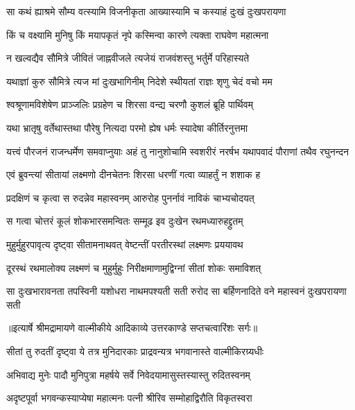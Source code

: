 \twolineshloka
{सा कथं ह्याश्रमे सौम्य वत्स्यामि विजनीकृता}
{आख्यास्यामि च कस्याहं दुःखं दुःखपरायणा} %

\twolineshloka
{किं च वक्ष्यामि मुनिषु किं मयापकृतं नृपे}
{कस्मिन्वा कारणे त्यक्ता राघवेण महात्मना} %

\twolineshloka
{न खल्वद्यैव सौमित्रे जीवितं जाह्नवीजले}
{त्यजेयं राजवंशस्तु भर्तुर्मे परिहास्यते} %

\twolineshloka
{यथाज्ञां कुरु सौमित्रे त्यज मां दुःखभागिनीम्}
{निदेशे स्थीयतां राज्ञः शृणु चेदं वचो मम} %

\twolineshloka
{श्वश्रूणामविशेषेण प्राञ्जलिः प्रग्रहेण च}
{शिरसा वन्द्य चरणौ कुशलं ब्रूहि पार्थिवम्} %

\twolineshloka
{यथा भ्रातृषु वर्तेथास्तथा पौरेषु नित्यदा}
{परमो ह्येष धर्मः स्यादेषा कीर्तिरनुत्तमा} %

\threelineshloka
{यत्त्वं पौरजनं राजन्धर्मेण समवाप्नुयाः}
{अहं तु नानुशोचामि स्वशरीरं नरर्षभ}
{यथापवादं पौराणां तथैव रघुनन्दन} %

\twolineshloka
{एवं ब्रुवन्त्यां सीतायां लक्ष्मणो दीनचेतनः}
{शिरसा धरणीं गत्वा व्याहर्तुं न शशाक ह} %

\twolineshloka
{प्रदक्षिणं च कृत्वा स रुदन्नेव महास्वनम्}
{आरुरोह पुनर्नावं नाविकं चाभ्यचोदयत्} %

\twolineshloka
{स गत्वा चोत्तरं कूलं शोकभारसमन्वितः}
{सम्मूढ इव दुःखेन रथमध्यारुहद्द्रुतम्} %

\twolineshloka
{मुहुर्मुहुरपावृत्य दृष्ट्वा सीतामनाथवत्}
{वेष्टन्तीं परतीरस्थां लक्ष्मणः प्रययावथ} %

\twolineshloka
{दूरस्थं रथमालोक्य लक्ष्मणं च मुहुर्मुहुः}
{निरीक्षमाणामुद्विग्नां सीतां शोकः समाविशत्} %

\fourlineindentedshloka
{सा दुःखभारावनता तपस्विनी}
{यशोधरा नाथमपश्यती सती}
{रुरोद सा बर्हिणनादिते वने}
{महास्वनं दुःखपरायणा सती} %


{॥इत्यार्षे श्रीमद्रामायणे वाल्मीकीये आदिकाव्ये उत्तरकाण्डे सप्तचत्वारिंशः सर्गः॥}


\twolineshloka
{सीतां तु रुदतीं दृष्ट्वा ये तत्र मुनिदारकाः}
{प्राद्रवन्यत्र भगवानास्ते वाल्मीकिरग्र्यधीः} %

\twolineshloka
{अभिवाद्य मुनेः पादौ मुनिपुत्रा महर्षये}
{सर्वे निवेदयामासुस्तस्यास्तु रुदितस्वनम्} %

\twolineshloka
{अदृष्टपूर्वा भगवन्कस्याप्येषा महात्मनः}
{पत्नी श्रीरिव सम्मोहाद्विरौति विकृतस्वरा} %

